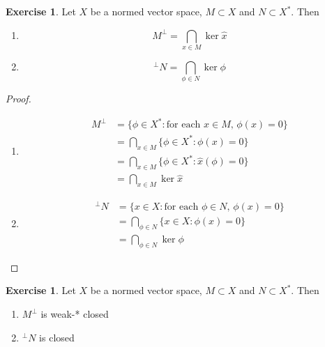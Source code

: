 \documentclass[12pt]{amsart}
\theoremstyle{definition}
\newtheorem{ex}[definition]{Exercise}
\begin{document}
	\begin{ex}
	Let $X$ be a normed vector space, $M \subset X$ and $N \subset X^*$. Then 
	\begin{enumerate}
	\item $$M^{\perp} = \bigcap_{x \in M} \ker \hat{x}$$
	\item $$^{\perp}N = \bigcap_{\phi \in N} \ker \phi $$
	\end{enumerate}
	\end{ex}
	
	\begin{proof}\
	\begin{enumerate}
	\item 
	\begin{align*}
	M^{\perp} 
	&= \{\phi \in X^*: \text{for each $x \in M$, $\phi(x) = 0$}\} \\
	&= \bigcap_{x \in M} \{\phi \in X^*: \phi(x) = 0\} \\
	&= \bigcap_{x \in M} \{\phi \in X^*: \hat{x}(\phi) = 0\} \\
	&= \bigcap_{x \in M} \ker \hat{x}
	\end{align*}
	\item 
	\begin{align*}
	^{\perp}N 
	&= \{x \in X: \text{for each $\phi \in N$, $\phi(x) = 0$}\} \\
	&= \bigcap_{\phi \in N} \{x \in X: \phi(x) = 0\} \\
	&= \bigcap_{\phi \in N} \ker \phi
	\end{align*}
	\end{enumerate}
	\end{proof}
	
	\begin{ex}
	Let $X$ be a normed vector space, $M \subset X$ and $N \subset X^*$. Then 
	\begin{enumerate}
	\item $M^{\perp}$ is weak-* closed
	\item $^{\perp} N$ is closed
	\end{enumerate}
	\end{ex}
	
\end{document}
